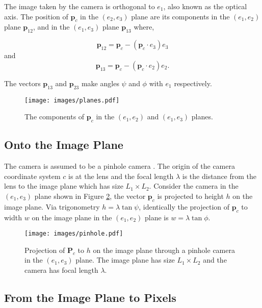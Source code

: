 \documentclass[12pt]{article}
\begin{document}
The image taken by the camera is orthogonal to $e_1$, also known as the optical axis. The position of $\textbf{p}_c$ in the $(e_2,e_3)$ plane are its components in the $(e_1,e_2)$ plane $\textbf{p}_{12}$, and in the $(e_1,e_3)$ plane $\textbf{p}_{13}$ where,

$$\textbf{p}_{12} =\textbf{p}_c - (\textbf{p}_c \cdot e_3)e_3$$
and
$$\textbf{p}_{13} =\textbf{p}_c - (\textbf{p}_c \cdot e_2)e_2.$$


The vectors $\textbf{p}_{13}$ and $\textbf{p}_{23}$ make angles $\psi$ and $\phi$ with $e_1$ respectively.

\begin{figure}[h]
\centering
\texttt{[image: images/planes.pdf]}
\caption{The components of $\textbf{p}_c$ in the $(e_1,e_2)$ and $(e_1,e_3)$ planes.}\label{fig:planes}
\end{figure}


\subsection{Onto the Image Plane}\label{ontotheplane}

The camera is assumed to be a pinhole camera \cite{pinholeModel}. The origin of the camera coordinate system $c$ is at the lens and the focal length $\lambda$ is the distance from the lens to the image plane which has size $L_1 \times L_2$. Consider the camera in the $(e_1,e_3)$ plane shown in Figure \ref{fig:pinhole}, the vector $\textbf{p}_c$ is projected to height $h$ on the image plane. Via trigonometry $h = \lambda\tan\psi$, identically the projection of $\textbf{p}_c$ to width $w$ on the image plane in the $(e_1,e_2)$ plane is $w = \lambda\tan\phi$.

\begin{figure}[h]
\centering
\texttt{[image: images/pinhole.pdf]}
\caption{Projection of $\textbf{P}_c$ to $h$ on the image plane through a pinhole camera in the $(e_1,e_3)$ plane. The image plane has size $L_1\times L_2$ and the camera has focal length $\lambda$.}\label{fig:pinhole}
\end{figure}


\subsection{From the Image Plane to Pixels}
\end{document}
